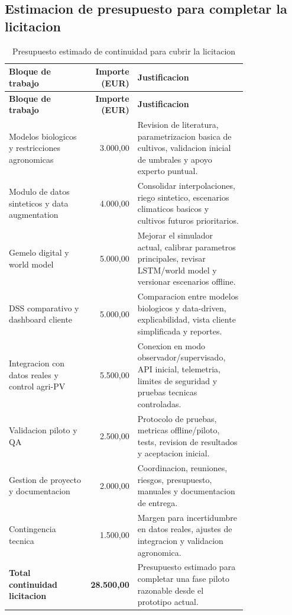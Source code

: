 ﻿\documentclass[11pt,a4paper]{article}
\begin{document}
\subsection{Estimacion de presupuesto para completar la licitacion}

\begin{longtable}{p{0.34\linewidth}r p{0.46\linewidth}}
\caption{Presupuesto estimado de continuidad para cubrir la licitacion}\\
\toprule
\textbf{Bloque de trabajo} & \textbf{Importe (EUR)} & \textbf{Justificacion} \\
\midrule
\endfirsthead
\toprule
\textbf{Bloque de trabajo} & \textbf{Importe (EUR)} & \textbf{Justificacion} \\
\midrule
\endhead
Modelos biologicos y restricciones agronomicas & 3.000,00 & Revision de literatura, parametrizacion basica de cultivos, validacion inicial de umbrales y apoyo experto puntual. \\ \addlinespace
Modulo de datos sinteticos y data augmentation & 4.000,00 & Consolidar interpolaciones, riego sintetico, escenarios climaticos basicos y cultivos futuros prioritarios. \\ \addlinespace
Gemelo digital y world model & 5.000,00 & Mejorar el simulador actual, calibrar parametros principales, revisar LSTM/world model y versionar escenarios offline. \\ \addlinespace
DSS comparativo y dashboard cliente & 5.000,00 & Comparacion entre modelos biologicos y data-driven, explicabilidad, vista cliente simplificada y reportes. \\ \addlinespace
Integracion con datos reales y control agri-PV & 5.500,00 & Conexion en modo observador/supervisado, API inicial, telemetria, limites de seguridad y pruebas tecnicas controladas. \\ \addlinespace
Validacion piloto y QA & 2.500,00 & Protocolo de pruebas, metricas offline/piloto, tests, revision de resultados y aceptacion inicial. \\ \addlinespace
Gestion de proyecto y documentacion & 2.000,00 & Coordinacion, reuniones, riesgos, presupuesto, manuales y documentacion de entrega. \\ \addlinespace
Contingencia tecnica & 1.500,00 & Margen para incertidumbre en datos reales, ajustes de integracion y validacion agronomica. \\
\midrule
\textbf{Total continuidad licitacion} & \textbf{28.500,00} & Presupuesto estimado para completar una fase piloto razonable desde el prototipo actual. \\
\bottomrule
\end{longtable}
\end{document}
